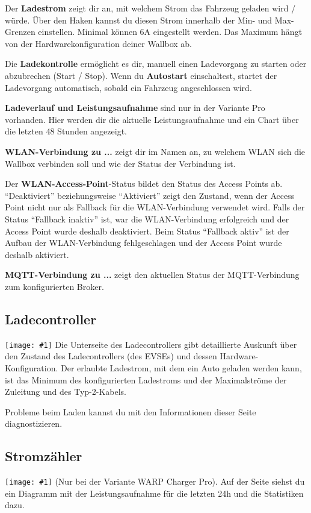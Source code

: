 \documentclass[a4paper,10pt]{article}
\newcommand{\gfx}[1]{\texttt{[image: \#1]}}
\begin{document}
\begin{multicols*}{2}
	Der \textbf{Ladestrom} zeigt dir an, mit welchem Strom das Fahrzeug geladen
	wird / würde. Über den Haken kannst du diesen Strom innerhalb der Min-
	und Max-Grenzen einstellen. Minimal können 6A eingestellt werden. Das
	Maximum hängt von der Hardwarekonfiguration deiner Wallbox ab.

	Die \textbf{Ladekontrolle} ermöglicht es dir, manuell einen Ladevorgang zu
	starten oder abzubrechen (Start / Stop). Wenn du \textbf{Autostart}
	einschaltest, startet der Ladevorgang automatisch, sobald ein Fahrzeug
	angeschlossen wird.

	\textbf{Ladeverlauf und Leistungsaufnahme} sind nur in der Variante Pro
	vorhanden. Hier werden dir die aktuelle Leistungsaufnahme und ein Chart über
	die letzten 48 Stunden angezeigt.

	\textbf{WLAN-Verbindung zu ...} zeigt dir im Namen an, zu welchem WLAN
	sich die Wallbox verbinden soll und wie der Status der Verbindung ist.

	Der \textbf{WLAN-Access-Point}-Status bildet den Status des Access Points ab.
	\enquote{Deaktiviert} beziehungsweise \enquote{Aktiviert} zeigt den Zustand, wenn der Access Point nicht
	nur als Fallback für die WLAN-Verbindung verwendet wird. Falls der Status \enquote{Fallback inaktiv} ist,
	war die WLAN-Verbindung erfolgreich und der Access Point wurde deshalb deaktiviert.
	Beim Status \enquote{Fallback aktiv} ist der Aufbau der WLAN-Verbindung fehlgeschlagen und der
	Access Point wurde deshalb aktiviert.

	\textbf{MQTT-Verbindung zu ...} zeigt den aktuellen Status der MQTT-Verbindung
	zum konfigurierten Broker.

	\subsection{Ladecontroller}
	\gfx{./img/resized/web_evse}
	Die Unterseite des Ladecontrollers gibt detaillierte Auskunft über den Zustand
	des Ladecontrollers (des EVSEs) und dessen Hardware-Konfiguration. Der
	erlaubte Ladestrom, mit dem ein Auto geladen werden kann, ist das Minimum des
	konfigurierten Ladestroms und der Maximalströme der Zuleitung und des Typ-2-Kabels.

	Probleme beim Laden kannst du mit den Informationen dieser
	Seite diagnostizieren.

	\subsection{Stromzähler}
	\gfx{./img/resized/web_meter}
	(Nur bei der Variante WARP Charger Pro). Auf der Seite
	siehst du ein Diagramm mit der Leistungsaufnahme für die letzten 24h und die
	Statistiken dazu.


\end{multicols*}
\end{document}
